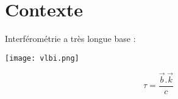 \section{Contexte}

\begin{frame}
  Interférométrie a très longue base : 
  \centerline{\texttt{[image: vlbi.png]}}
  $$ \tau = \frac{\vec{b}.\vec{k}}{c} $$
\end{frame}


